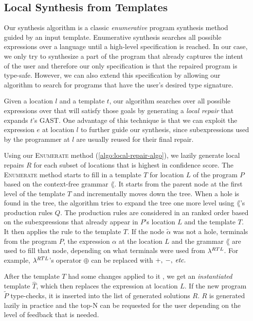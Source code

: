 \subsection{Local Synthesis from Templates}
\label{subsec:local-synthesis}

Our synthesis algorithm is a classic \emph{enumerative} program synthesis method
guided by an input template. Enumerative synthesis searches all possible
expressions over a language until a high-level
specification is reached. In our case, we only try to synthesize a part of the
program that already captures the intent of the user and therefore our only
specification is that the repaired program is type-safe. However, we can also
extend this specification by allowing our algorithm to search for programs that
have the user's desired type signature.

Given a location $l$ and a template $t$, our algorithm searches over all
possible expressions over \lang that will satisfy those goals by generating a
\emph{local repair} that expands $t$'s GAST. One advantage of this technique
is that we can exploit the expression $e$ at location $l$ to further guide our
synthesis, since subexpressions used by the programmer at $l$ are usually reused
for their final repair.



Using our \textsc{Enumerate} method (\autoref{algo:local-repair-algo}), we lazily generate local repairs $R$ for
each subset of locations that is highest in confidence score. The
\textsc{Enumerate} method starts to fill in a template $T$ for location $L$ of
the program $P$ based on the context-free grammar $\lang$. It starts from the
parent node at the first level of the template $T$ and incrementally moves
down the tree. When a hole is found in the tree, the algorithm tries to expand
the tree one more level using $\lang$'s production rules $Q$. The production
rules are considered in an ranked order based on the subexpressions that already
appear in $P$'s location $L$ and the template $T$. It then applies the rule to the
template $T$. If the node $\tilde{\alpha}$ was not a hole, terminals from the
program $P$, the expression $\alpha$ at the location $L$ and the grammar
$\lang$ are used to fill that node, depending on what terminals were used from
$\lambda^{RTL}$. For example, $\lambda^{RTL}$'s operator $\oplus$ can be replaced
with $+,\:-,\:\textit{etc.}$

After the template $T$ had some changes applied to it , we get an
\emph{instantiated} template $\hat{T}$, which then replaces the expression at
location $L$. If the new program $\tilde{P}$ type-checks, it is inserted into
the list of generated solutions $R$. $R$ is
generated lazily in practice and the top-N can be requested for the user
depending on the level of feedback that is needed.



